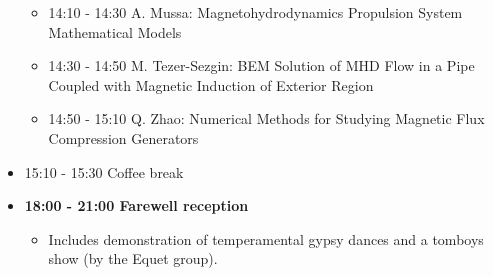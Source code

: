 \documentclass[10pt, A4]{article}%
\begin{document}
\begin{itemize}
\begin{itemize}
    \item 14:10 - 14:30 A. Mussa: Magnetohydrodynamics Propulsion System Mathematical Models
    \item 14:30 - 14:50 M. Tezer-Sezgin: BEM Solution of MHD Flow in a Pipe Coupled with Magnetic Induction of Exterior Region 
    \item 14:50 - 15:10 Q. Zhao: Numerical Methods for Studying Magnetic Flux Compression Generators 
  \end{itemize}
  \item 15:10 - 15:30 Coffee break
  \item {\bf 18:00 - 21:00 Farewell reception}
    \begin{itemize}
     \item Includes demonstration of temperamental gypsy dances and a tomboys show (by the Equet group).
  \end{itemize} 
\end{itemize}

\newpage
\end{document}
